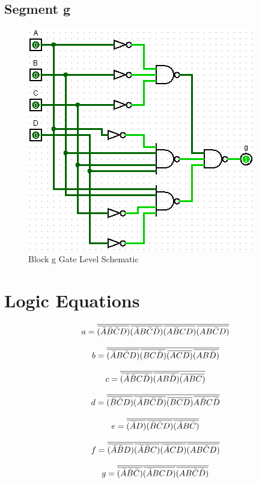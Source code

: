 \documentclass[12pt]{article}
\newcommand{\overbar}[1]{\mkern 1.5mu\overline{\mkern-1.5mu#1\mkern-1.5mu}\mkern 1.5mu} %
\begin{document}
\subsection{Segment g}
\begin{figure}[H]
	\centering
	\label{fig:gBlockGates}
	\includegraphics[width=0.65\linewidth, keepaspectratio]{g_logicCkt}
	\caption{Block g Gate Level Schematic}
\end{figure}


\newpage
\section{Logic Equations}
\label{app:logicEquations}
\begin{equation}
a = \overline{\overbar{(\bar{A}\bar{B}\bar{C}D)}\overbar{(\bar{A}B\bar{C}\bar{D})}\overbar{(A\bar{B}CD)}\overbar{(AB\bar{C}D)}}
\end{equation}

\begin{equation}
b = \overline{\overbar{(\bar{A}B\bar{C}D)}\overbar{(BC\bar{D})}\overbar{(ACD)}\overbar{(AB\bar{D})}}
\end{equation}

\begin{equation}
c = \overline{\overbar{(\bar{A}\bar{B}C\bar{D})}\overbar{(AB\bar{D})}\overbar{(ABC)}}
\end{equation}

\begin{equation}
d = \overline{\overbar{(\bar{B}\bar{C}D)}\overbar{(\bar{A}B\bar{C}\bar{D})}\overbar{(BCD)}\overbar{A\bar{B}C\bar{D}}}
\end{equation}

\begin{equation}
e = \overline{\overbar{(\bar{A}D)}\overbar{(\bar{B}\bar{C}D)}\overbar{(\bar{A}B\bar{C})}}
\end{equation}

\begin{equation}
f = \overline{\overbar{(\bar{A}\bar{B}D)}\overbar{(\bar{A}\bar{B}C)}\overbar{(\bar{A}CD)}\overbar{(AB\bar{C}D)}}
\end{equation}

\begin{equation}
g = \overline{\overbar{(\bar{A}\bar{B}\bar{C})}\overbar{(\bar{A}BCD)}\overbar{(AB\bar{C}\bar{D})}}
\end{equation}
\end{document}

